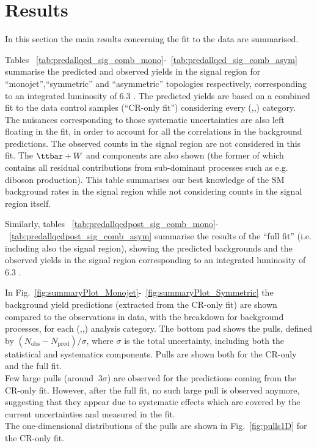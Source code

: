 \section{Results}
\label{sec:results}

In this section the main results concerning the fit to the data are summarised. 

Tables ~\ref{tab:predallqcd_sig_comb_mono}-~\ref{tab:predallqcd_sig_comb_asym} summarise 
the predicted and observed yields in the signal region 
for ``monojet'',``symmetric'' and ``asymmetric'' topologies respectively, 
corresponding to an integrated luminosity of 6.3 \ifb. 
The predicted yields are based on a combined fit to the data control samples (``CR-only fit'') considering every (\nj,\nb,\scalht) category. 
The nuisances corresponding to those systematic uncertainties are also left floating in the fit, 
in order to account for all the correlations in the background predictions. 
The observed counts in the signal region are not considered in this fit. 
The $\ttbar+W$ and \znunu components are also shown (the former of which contains all residual contributions from sub-dominant processes such as e.g. diboson production). 
This table summarises our best knowledge of the SM background rates in the signal region while not considering counts in the signal region itself. 

Similarly, tables ~\ref{tab:predallqcdpost_sig_comb_mono}-~\ref{tab:predallqcdpost_sig_comb_asym} summarise the results of the ``full fit'' (i.e. including also the signal region), showing the predicted backgrounds and the observed yields in the signal region corresponding to an integrated luminosity of 6.3 \ifb.

In Fig.~\ref{fig:summaryPlot_Monojet}-~\ref{fig:summaryPlot_Symmetric} the background yield predictions (extracted from the CR-only fit)
are shown compared to the observations in data, with the breakdown for background processes, for each (\njet,\nb,\scalht) analysis category. 
The bottom pad shows the pulls, defined by $(N_{\mathrm{obs}}-N_{\mathrm{pred}})/\sigma$, where $\sigma$ is the total uncertainty, 
including both the statistical and systematics components. Pulls are shown both for the CR-only and the full fit. \\
Few large pulls (around $~3\sigma$) are observed for the predictions coming from the CR-only fit. 
However, after the full fit, no such large pull is observed anymore, suggesting that 
they appear due to systematic effects which are covered by the current uncertainties and measured in the fit. \\
The one-dimensional distributions of the pulls are shown in Fig.~\ref{fig:pulls1D} for the CR-only fit.


